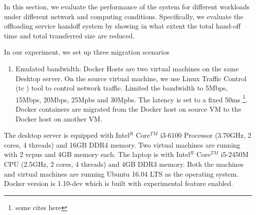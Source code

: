 
In this section, we evaluate the performance of the system for different workloads under different network and computing conditions. Specifically, we evaluate the offloading service handoff system by showing in what extent the total hand-off time and total transferred size are reduced.

In our experiment, we set up three migration scenarios
\begin{enumerate}
    \item Emulated bandwidth:
    Docker Hosts are two virtual machines on the same Desktop server. On the source virtual machine, we use Linux Traffic Control (tc\cite{tc} )  tool to control network traffic. Limited the bandwidth to 5Mbps, 15Mbps, 20Mbps, 25Mpbs and 30Mpbs. The latency is set to a fixed 50ms \footnote{some cites here}.
    Docker containers are migrated from the Docker host on source VM to the Docker host on another VM.
    
\end{enumerate}

The desktop server is equipped with Intel$^{R}$ Core$^{TM}$ i3-6100 Processor (3.70GHz, 2 cores, 4 threads) and 16GB DDR4 memory. Two virtual machines are running with 2 vcpus and 4GB memory each.
The laptop is with Intel$^{R}$ Core$^{TM}$ i5-2450M CPU (2.5GHz, 2 cores, 4 threads) and 4GB DDR3 memory. Both the machines and virtual machines are running Ubuntu 16.04 LTS as the operating system. Docker version is 1.10-dev which is built with experimental feature enabled.









